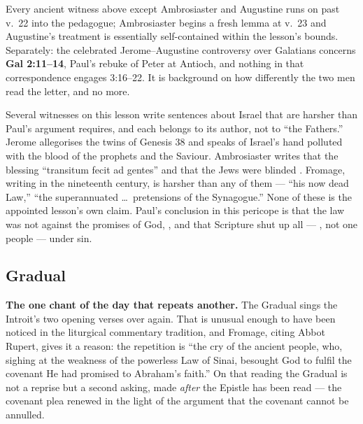 \begin{witnessnote}
Every ancient witness above except Ambrosiaster and Augustine runs on past
v.~22 into the pedagogue; Ambrosiaster begins a fresh lemma at v.~23 and
Augustine's treatment is essentially self-contained within the lesson's
bounds. Separately: the celebrated Jerome--Augustine controversy over
Galatians concerns \textbf{Gal 2:11--14}, Paul's rebuke of Peter at Antioch,
and nothing in that correspondence engages 3:16--22. It is background on how
differently the two men read the letter, and no more.
\end{witnessnote}

\begin{witnessnote}
Several witnesses on this lesson write sentences about Israel that are harsher
than Paul's argument requires, and each belongs to its author, not to ``the
Fathers.'' Jerome allegorises the twins of Genesis 38 and
speaks of Israel's hand polluted with the blood of the prophets and the
Saviour. Ambrosiaster writes that the blessing ``transitum fecit ad gentes''
and that the Jews were blinded . Fromage, writing
in the nineteenth century, is harsher than any of them --- ``his now dead
Law,'' ``the superannuated \dots\ pretensions of the Synagogue.'' None of these
is the appointed lesson's own claim. Paul's conclusion in this pericope is that
the law was not against the promises of God, , and that Scripture
shut up all --- , not one people --- under sin.
\end{witnessnote}

\elementguard
\subsection*{Gradual }


\textbf{The one chant of the day that repeats another.} The Gradual sings the
Introit's two opening verses over again. That is unusual enough to have been
noticed in the liturgical commentary tradition, and Fromage, citing Abbot
Rupert, gives it a reason: the repetition is ``the cry of the ancient people,
who, sighing at the weakness of the powerless Law of Sinai, besought God to
fulfil the covenant He had promised to Abraham's faith.'' On that reading the
Gradual is not a reprise but a second asking, made \textit{after} the Epistle
has been read --- the covenant plea renewed in the light of the argument that
the covenant cannot be annulled.

